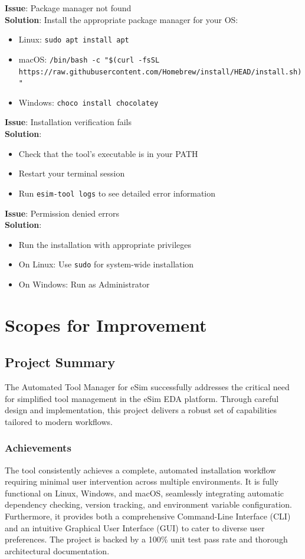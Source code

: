 \documentclass[12pt,a4paper]{report}
\begin{document}
\textbf{Issue}: Package manager not found \\
\textbf{Solution}: Install the appropriate package manager for your OS:
\begin{itemize}
    \item Linux: \texttt{sudo apt install apt}
    \item macOS: \texttt{/bin/bash -c "\$(curl -fsSL https://raw.githubusercontent.com/Homebrew/install/HEAD/install.sh)"}
    \item Windows: \texttt{choco install chocolatey}
\end{itemize}

\textbf{Issue}: Installation verification fails \\
\textbf{Solution}: 
\begin{itemize}
    \item Check that the tool's executable is in your PATH
    \item Restart your terminal session
    \item Run \texttt{esim-tool logs} to see detailed error information
\end{itemize}

\textbf{Issue}: Permission denied errors \\
\textbf{Solution}:
\begin{itemize}
    \item Run the installation with appropriate privileges
    \item On Linux: Use \texttt{sudo} for system-wide installation
    \item On Windows: Run as Administrator
\end{itemize}

\chapter{Scopes for Improvement}
\section{Project Summary}
The Automated Tool Manager for eSim successfully addresses the critical need for simplified tool management in the eSim EDA platform. Through careful design and implementation, this project delivers a robust set of capabilities tailored to modern workflows.

\subsection{Achievements}
The tool consistently achieves a complete, automated installation workflow requiring minimal user intervention across multiple environments. It is fully functional on Linux, Windows, and macOS, seamlessly integrating automatic dependency checking, version tracking, and environment variable configuration. Furthermore, it provides both a comprehensive Command-Line Interface (CLI) and an intuitive Graphical User Interface (GUI) to cater to diverse user preferences. The project is backed by a 100\% unit test pass rate and thorough architectural documentation.
\end{document}
